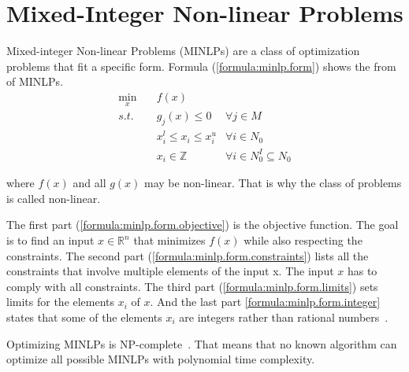 \section{Mixed-Integer Non-linear Problems}
\label{fundamentals:minlp}

Mixed-integer Non-linear Problems (MINLPs) are a class of optimization problems that fit a specific form.
Formula (\ref{formula:minlp.form}) shows the from of MINLPs.
\begin{subequations}
  \begin{align}
    \min_x \quad
    & f(x)
    \label{formula:minlp.form.objective}
    \\
    s.t. \quad
    & g_j(x) \leq 0
    & \forall j \in M
    \label{formula:minlp.form.constraints}
    \\
    & x_i^l \leq x_i \leq x_i^u
    & \forall i \in N_0
    \label{formula:minlp.form.limits}
    \\
    & x_i \in \mathbb{Z}
    & \forall i \in N_0^I \subseteq N_0
    \label{formula:minlp.form.integer}
  \end{align}
  \label{formula:minlp.form}
\end{subequations}

where $f(x)$ and all $g(x)$ may be non-linear.
That is why the class of problems is called non-linear.

The first part (\ref{formula:minlp.form.objective}) is the objective function.
The goal is to find an input $x \in \mathbb{R}^n$ that minimizes $f(x)$ while also respecting the constraints.
The second part (\ref{formula:minlp.form.constraints}) lists all the constraints that involve multiple elements of the input x.
The input $x$ has to comply with all constraints.
The third part (\ref{formula:minlp.form.limits}) sets limits for the elements $x_i$ of $x$.
And the last part \ref{formula:minlp.form.integer} states that some of the elements $x_i$ are integers rather than rational numbers~\cite{Belotti2009}.

Optimizing MINLPs is NP-complete~\cite{Bienstock1996}.
That means that no known algorithm can optimize all possible MINLPs with polynomial time complexity.
